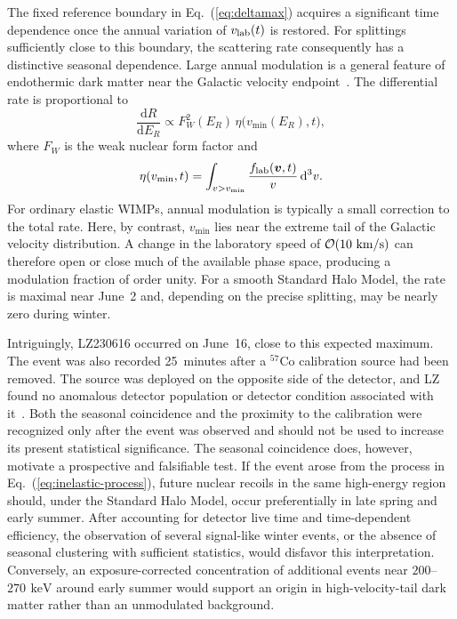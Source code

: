 \documentclass[aps,prd,twocolumn,nofootinbib,superscriptaddress]{revtex4-2}
\newcommand{\keV}{\,\mathrm{keV}}
\newcommand{\dd}{\mathrm{d}}
\begin{document}
The fixed reference boundary in Eq.~(\ref{eq:deltamax}) acquires a significant time dependence once the annual variation of $v_{\rm lab}(t)$ is restored. For splittings sufficiently close to this boundary, the scattering rate consequently has a distinctive seasonal dependence. Large annual modulation is a general feature of endothermic dark matter near the Galactic velocity endpoint~\cite{LZ:2026}. The differential rate is proportional to
%
\begin{equation}
  \frac{\dd R}{\dd E_R} \propto F_W^2(E_R)\, \eta\bigl(v_{\min}(E_R),t\bigr),
\end{equation}
%
where $F_W$ is the weak nuclear form factor and
%
\begin{equation}
  \eta(v_{\min},t) = \int_{v>v_{\min}} \frac{f_{\rm lab}(\bm v,t)}{v}\,\dd^3v.
\end{equation}
%
For ordinary elastic WIMPs, annual modulation is typically a small correction to the total rate. Here, by contrast, $v_{\min}$ lies near the extreme tail of the Galactic velocity distribution. A change in the laboratory speed of ${\cal O}(10~\mathrm{km/s})$ can therefore open or close much of the available phase space, producing a modulation fraction of order unity. For a smooth Standard Halo Model, the rate is maximal near June~2 and, depending on the precise splitting, may be nearly zero during winter.

Intriguingly, LZ230616 occurred on June~16, close to this expected maximum. The event was also recorded 25~minutes after a $^{57}\mathrm{Co}$ calibration source had been removed. The source was deployed on the opposite side of the detector, and LZ found no anomalous detector population or detector condition associated with it~\cite{LZ:2026}. Both the seasonal coincidence and the proximity to the calibration were recognized only after the event was observed and should not be used to increase its present statistical significance. The seasonal coincidence does, however, motivate a prospective and falsifiable test. If the event arose from the process in Eq.~(\ref{eq:inelastic-process}), future nuclear recoils in the same high-energy region should, under the Standard Halo Model, occur preferentially in late spring and early summer. After accounting for detector live time and time-dependent efficiency, the observation of several signal-like winter events, or the absence of seasonal clustering with sufficient statistics, would disfavor this interpretation. Conversely, an exposure-corrected concentration of additional events near $200$--$270~\keV$ around early summer would support an origin in high-velocity-tail dark matter rather than an unmodulated background.
\end{document}
